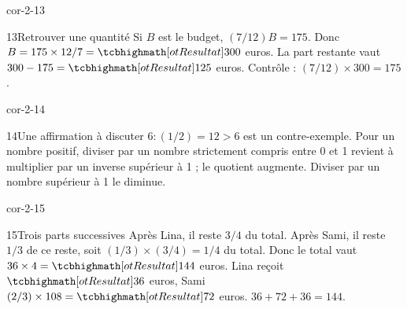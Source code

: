 \begin{blocLivre}{cor-2-13}\begin{corrige}{13}{Retrouver une quantité}
Si $B$ est le budget, $(7/12)B=175$. Donc $B=175\times12/7=\res{300}$ euros. La part restante vaut $300-175=\res{125}$ euros. Contrôle : $(7/12)\times300=175$.
\end{corrige}\end{blocLivre}
\begin{blocLivre}{cor-2-14}\begin{corrige}{14}{Une affirmation à discuter}
$6:(1/2)=12>6$ est un contre-exemple. Pour un nombre positif, diviser par un nombre strictement compris entre 0 et 1 revient à multiplier par un inverse supérieur à 1 ; le quotient augmente. Diviser par un nombre supérieur à 1 le diminue.
\end{corrige}\end{blocLivre}
\begin{blocLivre}{cor-2-15}\begin{corrige}{15}{Trois parts successives}
Après Lina, il reste $3/4$ du total. Après Sami, il reste $1/3$ de ce reste, soit $(1/3)\times(3/4)=1/4$ du total. Donc le total vaut $36\times4=\res{144}$ euros. Lina reçoit $\res{36}$ euros, Sami $(2/3)\times108=\res{72}$ euros. $36+72+36=144$.
\end{corrige}\end{blocLivre}
